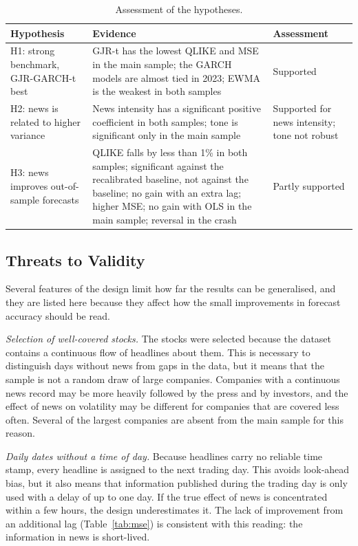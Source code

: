 \documentclass[12pt,a4paper]{article}
\begin{document}
\begin{table}[htbp]
  \centering\small
  \caption[Assessment of the hypotheses]{Assessment of the hypotheses.}
  \label{tab:hypotheses}
  \begin{tabular}{p{2.8cm}p{6.0cm}p{3.4cm}}
    \toprule
    Hypothesis & Evidence & Assessment \\
    \midrule
    H1: strong benchmark, GJR-GARCH-t best & GJR-t has the lowest QLIKE and MSE in the main sample; the GARCH models are almost tied in 2023; EWMA is the weakest in both samples & Supported \\
    H2: news is related to higher variance & News intensity has a significant positive coefficient in both samples; tone is significant only in the main sample & Supported for news intensity; tone not robust \\
    H3: news improves out-of-sample forecasts & QLIKE falls by less than 1\% in both samples; significant against the recalibrated baseline, not against the baseline; no gain with an extra lag; higher MSE; no gain with OLS in the main sample; reversal in the crash & Partly supported \\
    \bottomrule
  \end{tabular}
\end{table}

\subsection{Threats to Validity}\label{sec:disc-validity}
Several features of the design limit how far the results can be generalised, and they are listed here because they affect how the small improvements in forecast accuracy should be read.

\emph{Selection of well-covered stocks.} The stocks were selected because the dataset contains a continuous flow of headlines about them. This is necessary to distinguish days without news from gaps in the data, but it means that the sample is not a random draw of large companies. Companies with a continuous news record may be more heavily followed by the press and by investors, and the effect of news on volatility may be different for companies that are covered less often. Several of the largest companies are absent from the main sample for this reason.

\emph{Daily dates without a time of day.} Because headlines carry no reliable time stamp, every headline is assigned to the next trading day. This avoids look-ahead bias, but it also means that information published during the trading day is only used with a delay of up to one day. If the true effect of news is concentrated within a few hours, the design underestimates it. The lack of improvement from an additional lag (Table~\ref{tab:mse}) is consistent with this reading: the information in news is short-lived.
\end{document}
